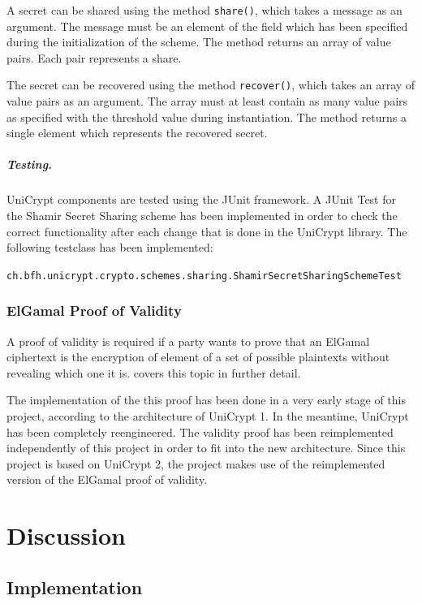 \documentclass[numbers=noenddot, abstract=on, a4paper, headsepline,
footsepline, oneside, draft=off]{scrreprt}
\begin{document}
A secret can be shared using the method \texttt{share()}, which takes
a message as an argument. The message must be an element of the field which has
been specified during the initialization of the scheme. The method returns an
array of value pairs. Each pair represents a share.

The secret can be recovered using the method \texttt{recover()}, which takes an
array of value pairs as an argument. The array must at least contain as many
value pairs as specified with the threshold value during instantiation. The
method returns a single element which represents the recovered secret.

\paragraph{Testing.}
UniCrypt components are tested using the JUnit framework. A JUnit Test for the
Shamir Secret Sharing scheme has been implemented in order to check the correct
functionality after each change that is done in the UniCrypt library. The
following testclass has been implemented:

\texttt{ch.bfh.unicrypt.crypto.schemes.sharing.ShamirSecretSharingSchemeTest}

\subsection{ElGamal Proof of Validity}
A proof of validity is required if a party wants to prove that an ElGamal
ciphertext is the encryption of element of a set of possible plaintexts without
revealing which one it is.  covers this topic in
further detail.

The implementation of the this proof has been done in a very early stage of this
project, according to the architecture of UniCrypt 1. In the meantime, UniCrypt
has been completely reengineered. The validity proof has been reimplemented
independently of this project in order to fit into the new architecture. Since
this project is based on UniCrypt 2, the project makes use of the reimplemented
version of the ElGamal proof of validity.


\chapter{Discussion}
\label{cha:discussion}

\section{Implementation}
\label{sec:implementation}
\end{document}
